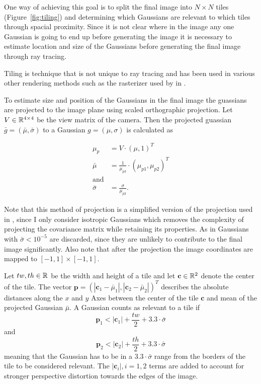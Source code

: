 \documentclass[a4paper, 11pt]{memoir}
\begin{document}
    One way of achieving this goal is to split the final image into $N \times N$ tiles (\eg Figure~\ref{fig:tiling})
    and determining which Gaussians are relevant to which tiles through spacial proximity. Since it is not clear where
    in the image any one Gaussian is going to end up before generating the image it is necessary to estimate location
    and size of the Gaussians before generating the final image through ray tracing.

    Tiling is technique that is not unique to ray tracing and has been used in various other rendering methods such as
    the rasterizer used by \citeauthor{kerbl3Dgaussians} in \cite{kerbl3Dgaussians}.

    To estimate size and position of the Gaussians in the final image the guassians are projected to the image plane
    using scaled orthographic projection. Let $V \in \mathbb{R}^{4 \times 4}$ be the view matrix of the camera. Then the
    projected guassian $\bar{g} = (\bar{\mu}, \bar{\sigma})$ to a Gaussian $g = (\mu, \sigma)$ is calculated as

    \begin{align}
        \mu_p &= V \cdot (\mu, 1)^T\\
        \bar{\mu} &= \frac{1}{\mu_{p3}} \cdot (\mu_{p1}, \mu_{p2})^T \label{eq:tiling_projection}\\
        \text{and}\nonumber\\
        \bar{\sigma} &= \frac{\sigma}{\mu_{p3}}.
        \label{eq:tiling_scale}
    \end{align}

    Note that this method of projection is a simplified version of the projection used in \cite{kerbl3Dgaussians},
    since I only consider isotropic Gaussians which removes the complexity of projecting the covariance matrix while
    retaining its properties. As in \cite{Rhodin:2015} Gaussians with $\bar{\sigma} < 10^{-5}$ are discarded, since
    they are unlikely to contribute to the final image significantly. Also note that after the projection the image
    coordinates are mapped to $[-1, 1] \times [-1, 1]$.

    Let $tw, th \in \mathbb{R}$ be the width and height of a tile and let $\mathbf{c} \in \mathbb{R}^2$ denote the center of the tile.
    The vector $\mathbf{p} = (|\mathbf{c}_1 - \bar{\mu}_1|, |\mathbf{c}_2 - \bar{\mu}_2|)^T$ describes the absolute
    distances along the $x$ and $y$ Axes between the center of the tile $\mathbf{c}$ and mean of the projected
    Gaussian $\bar{\mu}$. A Gaussian counts as relevant to a tile if
    \begin{equation}
        \mathbf{p}_1 < |\mathbf{c}_1| + \frac{tw}{2} + 3.3\cdot\bar{\sigma}
        \label{eq:tiling_cond_1}
    \end{equation}
    and 
    \begin{equation}
        \mathbf{p}_2 < |\mathbf{c}_2| + \frac{th}{2} + 3.3\cdot\bar{\sigma}
        \label{eq:tiling_cond_2}
    \end{equation}
    meaning that the Gaussian has to be in a $3.3 \cdot \bar{\sigma}$ range from the borders of the tile to be
    considered relevant. The $|\mathbf{c}_i|, i=1,2$ terms are added to account for stronger perspective distortion
    towards the edges of the image.
\end{document}
